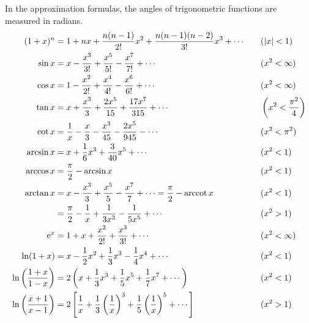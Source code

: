 {\small
In the approximation formulas, the angles of trigonometric functions are measured in radians.
\begin{alignat*}{2}
(1+x)^n &= 1+nx+\frac{n(n-1)}{2!}x^2+\frac{n(n-1)(n-2)}{3!}x^3+\cdots &&\quad (|x|<1)\\
\sin x &= x-\frac{x^3}{3!}+\frac{x^5}{5!}-\frac{x^7}{7!}+\cdots &&\quad (x^2<\infty)\\
\cos x &= 1-\frac{x^2}{2!}+\frac{x^4}{4!}-\frac{x^6}{6!}+\cdots &&\quad (x^2<\infty)\\
\tan x &= x+\frac{x^3}{3}+\frac{2x^5}{15}+\frac{17x^7}{315}+\cdots &&\quad \left(x^2<\frac{\pi^2}{4}\right)\\
\cot x &= \frac1x-\frac{x}{3}-\frac{x^3}{45}-\frac{2x^5}{945}-\cdots &&\quad (x^2<\pi^2)\\
\arcsin x &= x+\frac16x^3+\frac{3}{40}x^5+\cdots &&\quad (x^2<1)\\
\arccos x &= \frac{\pi}{2}-\arcsin x &&\quad (x^2<1)\\
\arctan x &= x-\frac{x^3}{3}+\frac{x^5}{5}-\frac{x^7}{7}+\cdots=\frac{\pi}{2}-\operatorname{arccot} x &&\quad (x^2<1)\\
&= \frac{\pi}{2}-\frac1x+\frac{1}{3x^3}-\frac{1}{5x^5}+\cdots &&\quad (x^2>1)\\
\mathrm{e}^x &= 1+x+\frac{x^2}{2!}+\frac{x^3}{3!}+\cdots &&\quad (x^2<\infty)\\
\ln(1+x) &= x-\frac12x^2+\frac13x^3-\frac14x^4+\cdots &&\quad (x^2<1)\\
\ln\left(\frac{1+x}{1-x}\right) &= 2\left(x+\frac13x^3+\frac15x^5+\frac17x^7+\cdots\right) &&\quad (x^2<1)\\
\ln\left(\frac{x+1}{x-1}\right) &= 2\left[\frac1x+\frac13\left(\frac1x\right)^3+\frac15\left(\frac1x\right)^5+\cdots\right] &&\quad (x^2>1)
\end{alignat*}
\par}
